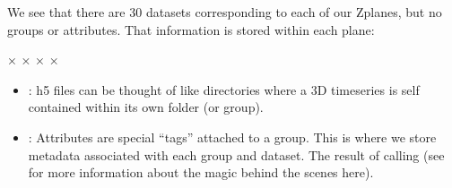 \documentclass[letterpaper,10pt,english]{sphinxmanual}
\begin{document}
\sphinxAtStartPar
We see that there are 30 datasets corresponding to each of our Z\sphinxhyphen{}planes, but no groups or attributes. That information is stored within each plane:

\begin{sphinxVerbatim}[commandchars=\\\{\}]


\PYG{p}{[}×\PYG{p}{]}
\PYG{p}{[}×\PYG{p}{]}
\PYG{p}{[}\PYG{p}{]}
\PYG{p}{[}×\PYG{p}{]}
\PYG{p}{[}×\PYG{p}{]}
\end{sphinxVerbatim}
\begin{itemize}
\item {} 
\sphinxAtStartPar
{}: h5 files can be thought of like directories where a 3D time\sphinxhyphen{}series is self contained within its own folder (or group).

\item {} 
\sphinxAtStartPar
{}: Attributes are special “tags” attached to a group. This is where we store metadata associated with each group and dataset. The result of calling  (see {\hyperref[\detokenize{user_guide/metadata:scanimage-metadata}]{}} for more information about the magic behind the scenes here).

\end{itemize}
\end{document}
